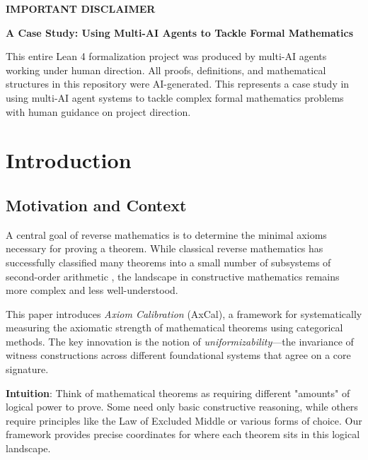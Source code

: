 \documentclass[11pt]{article}
\theoremstyle{plain}
\theoremstyle{definition}
\begin{document}
\begin{mdframed}[backgroundcolor=gray!10, linewidth=0pt]
\textbf{IMPORTANT DISCLAIMER}

\textbf{A Case Study: Using Multi-AI Agents to Tackle Formal Mathematics}

This entire Lean 4 formalization project was produced by multi-AI agents working under human direction. All proofs, definitions, and mathematical structures in this repository were AI-generated. This represents a case study in using multi-AI agent systems to tackle complex formal mathematics problems with human guidance on project direction.
\end{mdframed}

\tableofcontents

\section{Introduction}

\subsection{Motivation and Context}

A central goal of reverse mathematics is to determine the minimal axioms necessary for proving a theorem. While classical reverse mathematics has successfully classified many theorems into a small number of subsystems of second-order arithmetic \cite{Simpson2009}, the landscape in constructive mathematics remains more complex and less well-understood.

This paper introduces \emph{Axiom Calibration} (AxCal), a framework for systematically measuring the axiomatic strength of mathematical theorems using categorical methods. The key innovation is the notion of \emph{uniformizability}—the invariance of witness constructions across different foundational systems that agree on a core signature.

\begin{intuitionbox}
\textbf{Intuition}: Think of mathematical theorems as requiring different "amounts" of logical power to prove. Some need only basic constructive reasoning, while others require principles like the Law of Excluded Middle or various forms of choice. Our framework provides precise coordinates for where each theorem sits in this logical landscape.
\end{intuitionbox}
\end{document}
